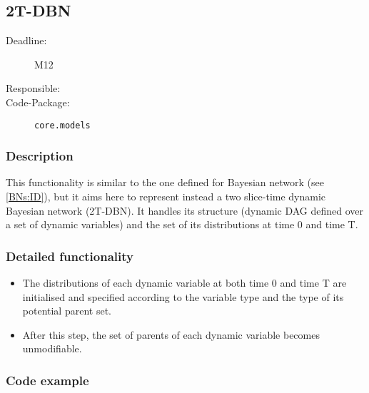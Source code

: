 \newpage
\subsection{2T-DBN}
\label{2TDBN:ID}

\begin{description}
\item[Deadline:] M12
\item[Responsible:]
\item[Code-Package:] \texttt{core.models}
\end{description}

\subsubsection*{Description}

This functionality is similar to the one defined for Bayesian network (see \ref{BNs:ID}), but it aims here to represent instead a two slice-time dynamic Bayesian network (2T-DBN). It handles its structure (dynamic DAG defined over a set of dynamic variables) and the set of its distributions at time 0 and time T. 

\subsubsection*{Detailed functionality}

\begin{itemize}

\item The distributions of each dynamic variable at both time 0 and time T are initialised and specified according to the variable type and the type of its potential parent set. 

\item After this step, the set of parents of each dynamic variable becomes unmodifiable.

\end{itemize}

\subsubsection*{Code example}

